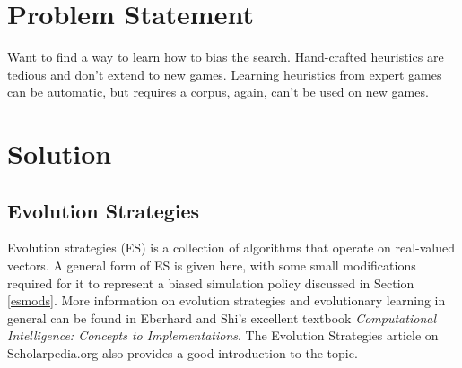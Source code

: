 \documentclass[10pt,a4paper]{report}
\begin{document}
\chapter{Problem Statement}\label{problem}
Want to find a way to learn how to bias the search. Hand-crafted heuristics are tedious and don't extend to new games. Learning heuristics from expert games can be automatic, but requires a corpus, again, can't be used on new games.

\chapter{Solution}\label{solution}

\section{Evolution Strategies}
Evolution strategies (ES) is a collection of algorithms that operate on real-valued vectors. A general form of ES is given here, with some small modifications required for it to represent a biased simulation policy discussed in Section \ref{esmods}. More information on evolution strategies and evolutionary learning in general can be found in Eberhard and Shi's excellent textbook \emph{Computational Intelligence: Concepts to Implementations}\cite{eberhart2007computational}. The Evolution Strategies article on Scholarpedia.org also provides a good introduction to the topic\cite{Beyer:2007}.
\end{document}

